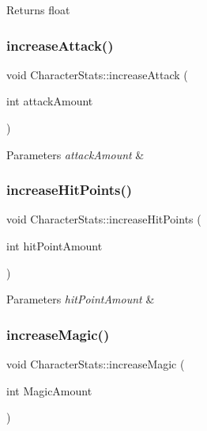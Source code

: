 \begin{DoxyReturn}{Returns}
float 
\end{DoxyReturn}
\mbox{\label{classCharacterStats_a5e9d5271f98b21c335cef1b3efe3ef2c}} 
\subsubsection{\texorpdfstring{increaseAttack()}{increaseAttack()}}
{\footnotesize\ttfamily void Character\+Stats\+::increase\+Attack (\begin{DoxyParamCaption}\item[{int}]{attack\+Amount }\end{DoxyParamCaption})}


\begin{DoxyParams}{Parameters}
{\em attack\+Amount} & \\
\hline
\end{DoxyParams}
\mbox{\label{classCharacterStats_a82b3b7fe66687a1210a8ea4c28d86738}} 
\subsubsection{\texorpdfstring{increaseHitPoints()}{increaseHitPoints()}}
{\footnotesize\ttfamily void Character\+Stats\+::increase\+Hit\+Points (\begin{DoxyParamCaption}\item[{int}]{hit\+Point\+Amount }\end{DoxyParamCaption})}


\begin{DoxyParams}{Parameters}
{\em hit\+Point\+Amount} & \\
\hline
\end{DoxyParams}
\mbox{\label{classCharacterStats_aa596a2a54f57b7a637d7be5be50433bb}} 
\subsubsection{\texorpdfstring{increaseMagic()}{increaseMagic()}}
{\footnotesize\ttfamily void Character\+Stats\+::increase\+Magic (\begin{DoxyParamCaption}\item[{int}]{Magic\+Amount }\end{DoxyParamCaption})}


